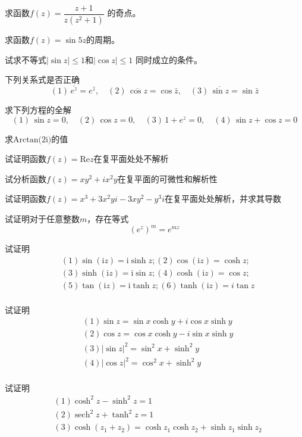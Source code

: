 \begin{Exercises}
  \item 求函数$f(z) = \dfrac{z+1}{z(z^2+1)}$ 的奇点。
  \item 求函数$f(z) = \sin 5 z$的周期。
  \item 试求不等式$|\sin z| \le 1$和$|\cos z| \le 1$ 同时成立的条件。
	\item 下列关系式是否正确 
	\[ (1) \, \overline{e^z} = e^{\bar{z}} , \quad 
  (2) \, \overline{\cos z} = \cos \bar{z} , \quad 
  (3) \, \overline{\sin z} = \sin \bar{z} \]
	\item 求下列方程的全解 
	\[ (1) \, \sin z =0, \quad 
  (2) \, \cos z = 0 , \quad 
  (3) \, 1+ e^z =0 , \quad 
  (4) \, \sin z + \cos z =0 \]
  \item 求$\text{Arctan(2i)}$的值
  \item 试证明函数$f(z) = \text{Re} z$在复平面处处不解析
  \item 试分析函数$f(z) = x y^2 + ix^2y$在复平面的可微性和解析性
  \item 试证明函数$f(z) = x^3 + 3x^2 y i - 3xy^2 - y^3 i$在复平面处处解析，并求其导数
  \item 试证明对于任意整数$m$，存在等式 
       \[ (e^z)^m = e^{mz}\]
  \item 试证明 
    \[ \begin{aligned}
&(1)  \sin (\mathrm{i} z)=\mathrm{i} \sinh z ; (2)  \cos (\mathrm{i} z)=\cosh z ; \\
&(3)  \sinh (\mathrm{i} z)=  \mathrm{i}\sin  z ; (4)  \cosh (\mathrm{i} z)=\cos z ; \\
&(5)  \tan (\mathrm{i} z)=\mathrm{i} \tanh z ; (6)  \tanh (\mathrm{i} z)=i \tan z  \\
    \end{aligned}\]
  \item 试证明 
  \[ \begin{aligned}
    &(1)  \sin z=\sin x  \cosh y+i \cos x  \sinh y \\
    &(2)  \cos z=\cos x  \cosh y-i \sin x  \sinh y \\
    &(3)  |\sin z|^{2}=\sin ^{2} x+\sinh ^{2} y \\
    &(4)  |\cos z|^{2}=\cos ^{2} x+\sinh ^{2} y \\
        \end{aligned}\]
  \item 试证明 
  \[ \begin{aligned}
    &(1)  \cosh ^{2} z-\sinh ^{2} z=1 \\
    &(2)  \operatorname{sech}^{2} z+\tanh ^{2} z=1 \\
    &(3)  \cosh \left(z_{1}+z_{2}\right)=\cosh z_{1} \cosh z_{2}+\sinh z_{1} \sinh z_{2} 
    \end{aligned}\]
\end{Exercises}
